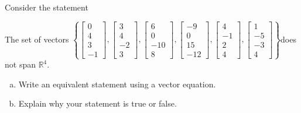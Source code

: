 
\begin{exerciseStatement}


Consider the statement 
\begin{center}\begin{minipage}{0.8\textwidth}
 The set of vectors \( \left\{ \left[\begin{array}{c}
0 \\
4 \\
3 \\
-1
\end{array}\right] , \left[\begin{array}{c}
3 \\
4 \\
-2 \\
3
\end{array}\right] , \left[\begin{array}{c}
6 \\
0 \\
-10 \\
8
\end{array}\right] , \left[\begin{array}{c}
-9 \\
0 \\
15 \\
-12
\end{array}\right] , \left[\begin{array}{c}
4 \\
-1 \\
2 \\
4
\end{array}\right] , \left[\begin{array}{c}
1 \\
-5 \\
-3 \\
4
\end{array}\right] \right\} \)does not span \(\mathbb{R}^4\). 
\end{minipage}\end{center}
    


\begin{enumerate}[(a)]
\item  Write an equivalent statement using a vector equation.
\item  Explain why your statement is true or false.
\end{enumerate}
    
\end{exerciseStatement}
    
